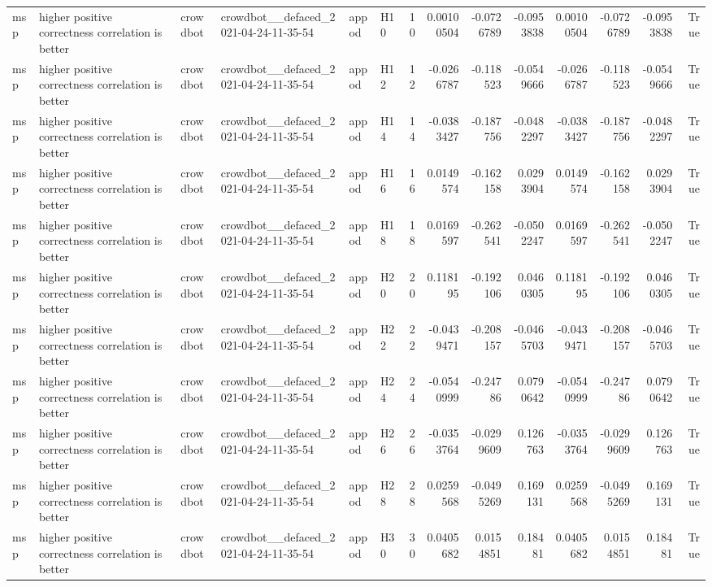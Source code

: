 \begin{longtable}{llllllrrrrrrrr}
msp & higher positive correctness correlation is better & crowdbot & crowdbot\_\_defaced\_2021-04-24-11-35-54 & appod & H10 & 10 & 0.00100504 & -0.0726789 & -0.0953838 & 0.00100504 & -0.0726789 & -0.0953838 & True \\
msp & higher positive correctness correlation is better & crowdbot & crowdbot\_\_defaced\_2021-04-24-11-35-54 & appod & H12 & 12 & -0.0266787 & -0.118523 & -0.0549666 & -0.0266787 & -0.118523 & -0.0549666 & True \\
msp & higher positive correctness correlation is better & crowdbot & crowdbot\_\_defaced\_2021-04-24-11-35-54 & appod & H14 & 14 & -0.0383427 & -0.187756 & -0.0482297 & -0.0383427 & -0.187756 & -0.0482297 & True \\
msp & higher positive correctness correlation is better & crowdbot & crowdbot\_\_defaced\_2021-04-24-11-35-54 & appod & H16 & 16 & 0.0149574 & -0.162158 & 0.0293904 & 0.0149574 & -0.162158 & 0.0293904 & True \\
msp & higher positive correctness correlation is better & crowdbot & crowdbot\_\_defaced\_2021-04-24-11-35-54 & appod & H18 & 18 & 0.0169597 & -0.262541 & -0.0502247 & 0.0169597 & -0.262541 & -0.0502247 & True \\
msp & higher positive correctness correlation is better & crowdbot & crowdbot\_\_defaced\_2021-04-24-11-35-54 & appod & H20 & 20 & 0.118195 & -0.192106 & 0.0460305 & 0.118195 & -0.192106 & 0.0460305 & True \\
msp & higher positive correctness correlation is better & crowdbot & crowdbot\_\_defaced\_2021-04-24-11-35-54 & appod & H22 & 22 & -0.0439471 & -0.208157 & -0.0465703 & -0.0439471 & -0.208157 & -0.0465703 & True \\
msp & higher positive correctness correlation is better & crowdbot & crowdbot\_\_defaced\_2021-04-24-11-35-54 & appod & H24 & 24 & -0.0540999 & -0.24786 & 0.0790642 & -0.0540999 & -0.24786 & 0.0790642 & True \\
msp & higher positive correctness correlation is better & crowdbot & crowdbot\_\_defaced\_2021-04-24-11-35-54 & appod & H26 & 26 & -0.0353764 & -0.0299609 & 0.126763 & -0.0353764 & -0.0299609 & 0.126763 & True \\
msp & higher positive correctness correlation is better & crowdbot & crowdbot\_\_defaced\_2021-04-24-11-35-54 & appod & H28 & 28 & 0.0259568 & -0.0495269 & 0.169131 & 0.0259568 & -0.0495269 & 0.169131 & True \\
msp & higher positive correctness correlation is better & crowdbot & crowdbot\_\_defaced\_2021-04-24-11-35-54 & appod & H30 & 30 & 0.0405682 & 0.0154851 & 0.18481 & 0.0405682 & 0.0154851 & 0.18481 & True \\

\end{longtable}
